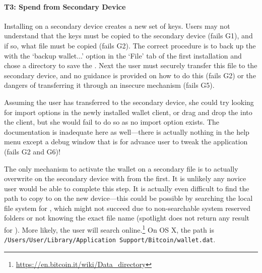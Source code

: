 \paragraph{T3: Spend from Secondary Device} Installing \bitcoinclient on a secondary device creates a new set of keys. Users may not understand that the keys must be copied to the secondary device (fails G1), and if so, what file must be copied (fails G2). The correct procedure is to back up the \walletfile with the `backup wallet...' option in the `File' tab of the first installation and chose a directory to save the \walletfile. Next the user must securely transfer this file to the secondary device, and no guidance is provided on how to do this (fails G2) or the dangers of transferring it through an insecure mechanism (fails G5).

Assuming the user has transferred \walletfile to the secondary device, she could try looking for import options in the newly installed wallet client, or drag and drop the \walletfile into the client, but she would fail to do so as no import option exists. The documentation is inadequate here as well---there is actually nothing in the help menu except a debug window that is for advance user to tweak the application (fails G2 and G6)!

The only mechanism to activate the wallet on a secondary file is to actually overwrite \walletfile on the secondary device with \walletfile from the first. It is unlikely any novice user would be able to complete this step. It is actually even difficult to find the path to copy \walletfile to on the new device---this could be possible by searching the local file system for \walletfile, which might not succeed due to non-searchable system reserved folders or not knowing the exact file name (spotlight does not return any result for \walletfile). More likely, the user will search online.\footnote{\url{https://en.bitcoin.it/wiki/Data_directory}} On OS X, the path is \texttt{/Users/User/Library/Application Support/Bitcoin/wallet.dat}.

